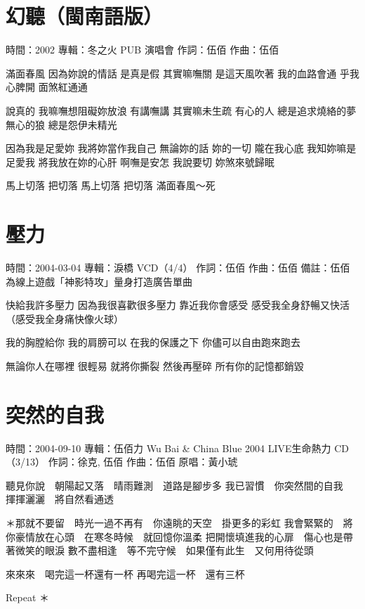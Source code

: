 \documentclass[UTF8,a4paper,oneside,twocolumn,12pt]{ctexbook}
\newcommand{\infopair}[2]{\textbullet #1：#2}
\newcommand{\zc}[1][伍佰]{\infopair{作詞}{#1}}
\newcommand{\zq}[1][伍佰]{\infopair{作曲}{#1}}
\newcommand{\zj}[1]{\infopair{專輯}{#1}}
\newcommand{\yc}[1]{\infopair{原唱}{#1}}
\newcommand{\sj}[1]{\infopair{時間}{#1}}
\newcommand{\bz}[1]{\infopair{備註}{#1}}
\newenvironment{info}{\begin{flushleft}\kaishu
	}
	{\end{flushleft}\normalsize\yahei\par}
\newenvironment{lyric}{
	}
{}
\begin{document}
\section{幻聽（閩南語版）}
\begin{info}
	\sj{2002}
	\zj{冬之火 PUB 演唱會}
	\zc
	\zq
\end{info}
\begin{lyric}
	滿面春風 因為妳說的情話 是真是假 其實嘛嘸關
	是這天風吹著 我的血路會通 乎我心脾開 面煞紅通通

	說真的 我嘛嘸想阻礙妳放浪 有講嘸講 其實嘛未生疏
	有心的人 總是追求燒絡的夢 無心的狼 總是怨伊未精光

	因為我是足愛妳 我將妳當作我自己 無論妳的話 妳的一切 隴在我心底
	我知妳嘛是足愛我 將我放在妳的心肝 啊嘸是安怎 我說要切 妳煞來號歸眠

	馬上切落 把切落 馬上切落 把切落 滿面春風～死
\end{lyric}

\section{壓力}
\begin{info}
	\sj{2004-03-04}
	\zj{淚橋 VCD（4/4）}
	\zc
	\zq
	\bz{伍佰為線上遊戲「神影特攻」量身打造廣告單曲}
\end{info}
\begin{lyric}
	快給我許多壓力
	因為我很喜歡很多壓力
	靠近我你會感受
	感受我全身舒暢又快活（感受我全身痛快像火球）

	我的胸膛給你
	我的肩膀可以
	在我的保護之下
	你儘可以自由跑來跑去

	無論你人在哪裡
	很輕易
	就將你撕裂
	然後再壓碎
	所有你的記憶都銷毀
\end{lyric}

\section{突然的自我}
\begin{info}
	\sj{2004-09-10}
	\zj{伍佰力 Wu Bai \& China Blue 2004 LIVE生命熱力 CD（3/13）}
	\zc[徐克, 伍佰]
	\zq
	\yc{黃小琥}
\end{info}
\begin{lyric}
	聽見你說　朝陽起又落　晴雨難測　道路是腳步多
	我已習慣　你突然間的自我　揮揮灑灑　將自然看通透

	＊那就不要留　時光一過不再有　你遠眺的天空　掛更多的彩虹
	我會緊緊的　將你豪情放在心頭　在寒冬時候　就回憶你溫柔
	把開懷填進我的心扉　傷心也是帶著微笑的眼淚
	數不盡相逢　等不完守候　如果僅有此生　又何用待從頭

	來來來　喝完這一杯還有一杯
	再喝完這一杯　還有三杯

	Repeat ＊
\end{lyric}
\end{document}
